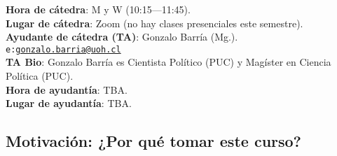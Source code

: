 \documentclass[letterpaper]{article}
\begin{document}
\vspace{5mm}
{\bf Hora de c\'atedra}: M y W (10:15---11:45).\\
{\bf Lugar de c\'atedra}: Zoom (no hay clases presenciales este semestre).\\


\vspace{5mm}
{\bf Ayudante de c\'atedra (TA)}: Gonzalo Barr\'ia (Mg.).\\
\texttt{e:}\href{mailto:gonzalo.barria@uoh.cl}{\texttt{gonzalo.barria@uoh.cl}}\\
{\bf TA Bio}: Gonzalo Barr\'ia es Cientista Pol\'itico (PUC) y Mag\'ister en Ciencia Pol\'itica (PUC).\\
{\bf Hora de ayudant\'ia}: TBA.\\
{\bf Lugar de ayudant\'ia}: TBA.\\





\subsection*{Motivaci\'on: ¿Por qu\'e tomar este curso?}
\end{document}
